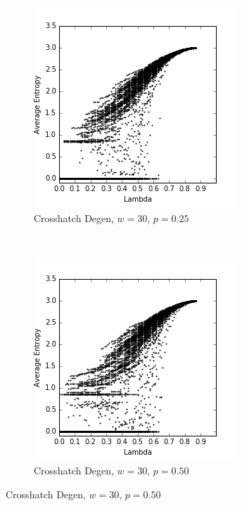 \documentclass[a4paper,11pt]{report}
\begin{document}
\begin{figure}[htp]
\centering
\begin{subfigure}[t]{0.4\textwidth}
  \includegraphics[width=\textwidth]{ch6_figs/ch_w30_p25_entropy_scatter}
  \caption{Crosshatch Degen, $w=30$, $p=0.25$}

\end{subfigure}
~
\begin{subfigure}[t]{0.4\textwidth}
  \centering
  \includegraphics[width=\textwidth]{ch6_figs/ch_w30_p50_entropy_scatter}
  \caption{Crosshatch Degen, $w=30$, $p=0.50$}


\end{subfigure}
\end{figure}
\end{document}

